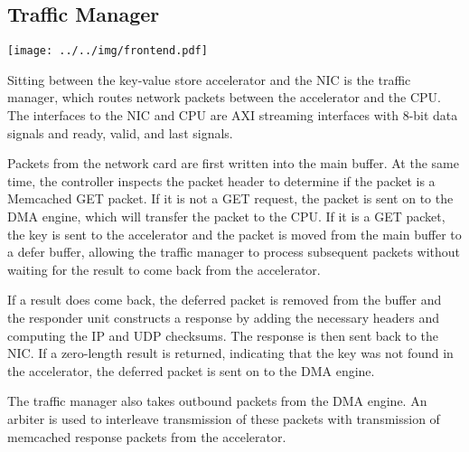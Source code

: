 \subsection{Traffic Manager}

\texttt{[image: ../../img/frontend.pdf]}

Sitting between the key-value store accelerator and the NIC is the traffic
manager, which routes network packets between the accelerator and the CPU.
The interfaces to the NIC and CPU are AXI streaming interfaces with 8-bit
data signals and ready, valid, and last signals.

Packets from the network card are first written into the main buffer.
At the same time, the controller inspects the packet header to determine if
the packet is a Memcached GET packet. If it is not a GET request, the packet
is sent on to the DMA engine, which will transfer the packet to the CPU.
If it is a GET packet, the key is sent to the accelerator and
the packet is moved from the main buffer to a defer buffer, allowing the
traffic manager to process subsequent packets without waiting for the result
to come back from the accelerator.

If a result does come back, the deferred packet is removed from the buffer and
the responder unit constructs a response by adding the necessary headers and
computing the IP and UDP checksums. The response is then sent back to the NIC.
If a zero-length result is returned, indicating that the key was not found in
the accelerator, the deferred packet is sent on to the DMA engine.

The traffic manager also takes outbound packets from the DMA engine. An arbiter
is used to interleave transmission of these packets with transmission of
memcached response packets from the accelerator.
